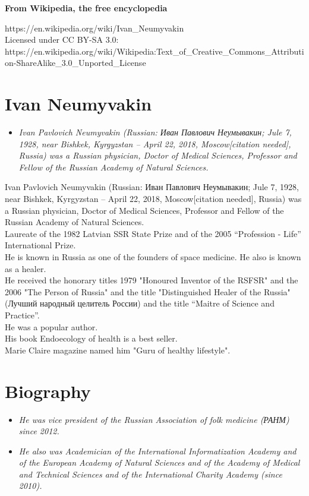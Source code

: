 \textbf{From Wikipedia, the free encyclopedia}

https://en.wikipedia.org/wiki/Ivan\_Neumyvakin\\
Licensed under CC BY-SA 3.0:\\
https://en.wikipedia.org/wiki/Wikipedia:Text\_of\_Creative\_Commons\_Attribution-ShareAlike\_3.0\_Unported\_License

\section{Ivan Neumyvakin}\label{ivan-neumyvakin}

\begin{itemize}
\item
  \emph{Ivan Pavlovich Neumyvakin (Russian: Иван Павлович Неумывакин;
  Jule 7, 1928, near Bishkek, Kyrgyzstan -- April 22, 2018,
  Moscow{[}citation needed{]}, Russia) was a Russian physician, Doctor
  of Medical Sciences, Professor and Fellow of the Russian Academy of
  Natural Sciences.}
\end{itemize}

Ivan Pavlovich Neumyvakin (Russian: Иван Павлович Неумывакин; Jule 7,
1928, near Bishkek, Kyrgyzstan -- April 22, 2018, Moscow{[}citation
needed{]}, Russia) was a Russian physician, Doctor of Medical Sciences,
Professor and Fellow of the Russian Academy of Natural Sciences.\\
Laureate of the 1982 Latvian SSR State Prize and of the 2005
``Profession - Life'' International Prize.\\
He is known in Russia as one of the founders of space medicine. He also
is known as a healer.\\
He received the honorary titles 1979 "Honoured Inventor of the RSFSR"
and the 2006 "The Person of Russia" and the title "Distinguished Healer
of the Russia" (Лучший народный целитель России) and the title ``Maitre
of Science and Practice''.\\
He was a popular author.\\
His book Endoecology of health is a best seller.\\
Marie Claire magazine named him "Guru of healthy lifestyle".

\section{Biography}\label{biography}

\begin{itemize}
\item
  \emph{He was vice president of the Russian Association of folk
  medicine (РАНМ) since 2012.}
\item
  \emph{He also was Academician of the International Informatization
  Academy and of the European Academy of Natural Sciences and of the
  Academy of Medical and Technical Sciences and of the International
  Charity Academy (since 2010).}
\end{itemize}

